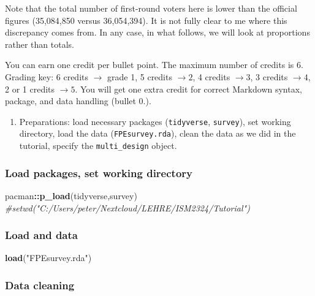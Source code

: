 \documentclass[
]{article}
\newenvironment{Shaded}{\begin{snugshade}}{\end{snugshade}}
\newcommand{\CommentTok}[1]{\textcolor[rgb]{0.56,0.35,0.01}{\textit{#1}}}
\newcommand{\FunctionTok}[1]{\textcolor[rgb]{0.13,0.29,0.53}{\textbf{#1}}}
\newcommand{\NormalTok}[1]{#1}
\newcommand{\SpecialCharTok}[1]{\textcolor[rgb]{0.81,0.36,0.00}{\textbf{#1}}}
\newcommand{\StringTok}[1]{\textcolor[rgb]{0.31,0.60,0.02}{#1}}
\providecommand{\tightlist}{%
  \setlength{\itemsep}{0pt}\setlength{\parskip}{0pt}}
\begin{document}
Note that the total number of first-round voters here is lower than the
official figures (35,084,850 versus 36,054,394). It is not fully clear
to me where this discrepancy comes from. In any case, in what follows,
we will look at proportions rather than totals.

You can earn one credit per bullet point. The maximum number of credits
is 6. Grading key: 6 credits \(\rightarrow\) grade 1, 5 credits
\(\rightarrow 2\), 4 credits \(\rightarrow 3\), 3 credits
\(\rightarrow 4\), 2 or 1 credits \(\rightarrow 5\). You will get one
extra credit for correct Markdown syntax, package, and data handling
(bullet 0.).

\begin{enumerate}
\def\labelenumi{\arabic{enumi}.}
\setcounter{enumi}{-1}
\tightlist
\item
  Preparations: load necessary packages (\texttt{tidyverse},
  \texttt{survey}), set working directory, load the data
  (\texttt{FPEsurvey.rda}), clean the data as we did in the tutorial,
  specify the \texttt{multi\_design} object.
\end{enumerate}

\subsubsection{Load packages, set working
directory}\label{load-packages-set-working-directory}

\begin{Shaded}
\begin{Highlighting}[]
\NormalTok{pacman}\SpecialCharTok{::}\FunctionTok{p\_load}\NormalTok{(tidyverse,survey)}
\CommentTok{\#setwd("C:/Users/peter/Nextcloud/LEHRE/ISM2324/Tutorial")}
\end{Highlighting}
\end{Shaded}

\subsubsection{Load and data}\label{load-and-data}

\begin{Shaded}
\begin{Highlighting}[]
\FunctionTok{load}\NormalTok{(}\StringTok{"FPEsurvey.rda"}\NormalTok{)}
\end{Highlighting}
\end{Shaded}

\subsubsection{Data cleaning}\label{data-cleaning}
\end{document}
